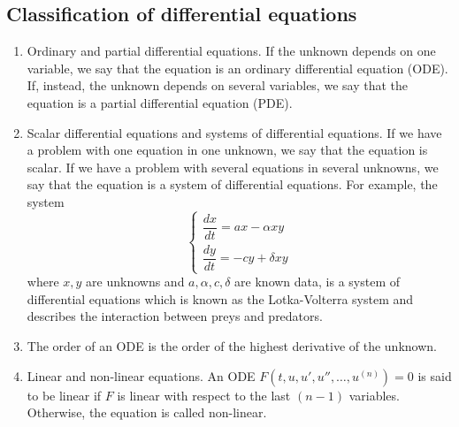 \documentclass[main.tex]{subfiles}
\begin{document}
\subsection{Classification of differential equations}
\begin{enumerate}
    \item Ordinary and partial differential equations. If the unknown depends on one variable, we say that the equation is an ordinary differential equation (ODE). If, instead, the unknown depends on several variables, we say that the equation is a partial differential equation (PDE). 
    \item Scalar differential equations and systems of differential equations. If we have a problem with one equation in one unknown, we say that the equation is scalar. If we have a problem with several equations in several unknowns, we say that the equation is a system of differential equations. For example, the system$$ 
    \begin{cases}
        \dfrac{dx}{dt} = a x - \alpha x y \\
        \dfrac{dy}{dt} = -cy + \delta x y
    \end{cases}
    $$
    where $x, y$ are unknowns and $a, \alpha, c, \delta$ are known data, is a system of differential equations which is known as the Lotka-Volterra system and describes the interaction between preys and predators. 
    \item The order of an ODE is the order of the highest derivative of the unknown. 
    \item Linear and non-linear equations. An ODE $F(t, u, u', u'', \ldots, u^{(n)}) = 0$ is said to be linear if $F$ is linear with respect to the last $(n - 1)$ variables. Otherwise, the equation is called non-linear. 
\end{enumerate}
\end{document}
